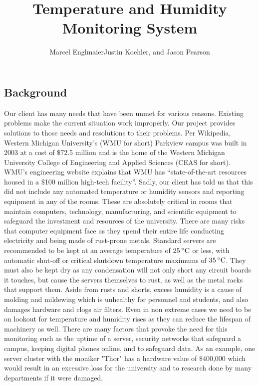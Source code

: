 \documentclass{report}
\begin{document}
\title{Temperature and Humidity Monitoring System}
\author{Marcel EnglmaierJustin Koehler, and Jason Pearson}
\maketitle
\tableofcontents
\newpage

\subsection*{Background}
\indent
\indent
Our client has many needs that have been unmet for various reasons. Existing problems make the current situation work improperly. Our project provides solutions to those needs and resolutions to their problems.
\newline
\indent
Per Wikipedia, Western Michigan University's (WMU for short) Parkview campus was built in 2003 at a cost of $\$$72.5 million and is the home of the Western Michigan University College of Engineering and Applied Sciences (CEAS for short). WMU’s engineering website explains that WMU has “state-of-the-art resources housed in a $\$$100 million high-tech facility”. Sadly, our client has told us that this did not include any automated temperature or humidity sensors and reporting equipment in any of the rooms. 
These are absolutely critical in rooms that maintain computers, technology, manufacturing, and scientific equipment to safeguard the investment and resources of the university.  There are many risks that computer equipment face as they spend their entire life conducting electricity and being made of rust-prone metals. Standard servers are recommended to be kept at an average temperature of $25\,^{\circ}{\rm C}$ or less, with automatic shut-off or critical shutdown temperature maximums of $35\,^{\circ}{\rm C}$. They must also be kept dry as any condensation will not only short any circuit boards it touches, but cause the servers themselves to rust, as well as the metal racks that support them. Aside from rusts and shorts, excess humidity is a cause of molding and mildewing which is unhealthy for personnel and students, and also damages hardware and clogs air filters. Even in non extreme cases we need to be on lookout for temperature and humidity rises as they can reduce the lifespan of machinery as well.
\newline
\indent
There are many factors that provoke the need for this monitoring such as the uptime of a server, security networks that safeguard a campus, keeping digital phones online, and to safeguard data. As an example, one server cluster with the moniker "Thor" has a hardware value of $\$$400,000 which would result in an excessive loss for the university and to research done by many departments if it were damaged.
\end{document}

